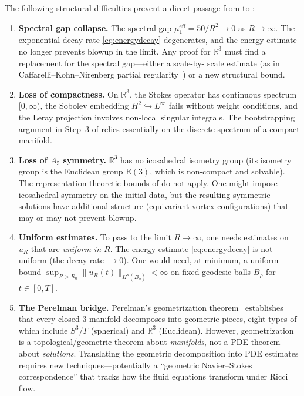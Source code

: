 \documentclass[11pt,a4paper]{article}
\theoremstyle{plain}
\theoremstyle{definition}
\newcommand{\R}{\mathbb{R}}
\newcommand{\norm}[1]{\lVert #1 \rVert}
\begin{document}
The following structural difficulties prevent a direct passage from
 to :

\begin{enumerate}[label=\textbf{O\arabic*.}, leftmargin=2em]
  \item \textbf{Spectral gap collapse.}
    The spectral gap $\mu_1^{\text{eff}} = 50/R^2 \to 0$ as $R \to \infty$.
    The exponential decay rate \eqref{eq:energydecay} degenerates, and the
    energy estimate no longer prevents blowup in the limit.  Any proof for
    $\R^3$ must find a replacement for the spectral gap---either a scale-by-%
    scale estimate (as in Caffarelli--Kohn--Nirenberg partial regularity~\cite{CKN}) or
    a new structural bound.

  \item \textbf{Loss of compactness.}
    On $\R^3$, the Stokes operator has continuous spectrum $[0,\infty)$, the
    Sobolev embedding $H^2 \hookrightarrow L^\infty$ fails without weight
    conditions, and the Leray projection involves non-local singular
    integrals.  The bootstrapping argument in Step~3 of 
    relies essentially on the discrete spectrum of a compact manifold.

  \item \textbf{Loss of $A_5$ symmetry.}
    $\R^3$ has no icosahedral isometry group (its isometry group is the
    Euclidean group $\mathrm{E}(3)$, which is non-compact and solvable).
    The representation-theoretic bounds of  do not apply.
    One might impose icosahedral symmetry on the initial data, but the
    resulting symmetric solutions have additional structure (equivariant
    vortex configurations) that may or may not prevent blowup.

  \item \textbf{Uniform estimates.}
    To pass to the limit $R \to \infty$, one needs estimates on $u_R$ that
    are \emph{uniform in $R$}.  The energy estimate \eqref{eq:energydecay}
    is not uniform (the decay rate $\to 0$).  One would need, at minimum,
    a uniform bound $\sup_{R > R_0} \norm{u_R(t)}_{H^s(B_\rho)} < \infty$
    on fixed geodesic balls $B_\rho$ for $t \in [0, T]$.

  \item \textbf{The Perelman bridge.}
    Perelman's geometrization theorem~\cite{Perelman1,Perelman2} establishes that every closed
    $3$-manifold decomposes into geometric pieces, eight types of which
    include $S^3/\Gamma$ (spherical) and $\R^3$ (Euclidean).  However,
    geometrization is a topological/geometric theorem about \emph{manifolds},
    not a PDE theorem about \emph{solutions}.  Translating the geometric
    decomposition into PDE estimates requires new techniques---potentially
    a ``geometric Navier--Stokes correspondence'' that tracks how the
    fluid equations transform under Ricci flow.
\end{enumerate}
\end{document}
